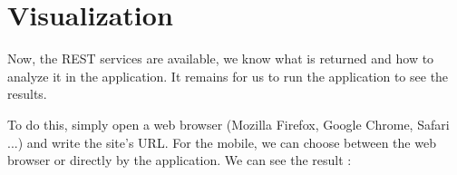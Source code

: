 

\section{Visualization}




Now, the REST services are available, we know what is returned and how to analyze it in the application. It remains for us to run the application to see the results.

To do this, simply open a web browser (Mozilla Firefox, Google Chrome, Safari ...) and write the site's URL. For the mobile, we can choose between the web browser or directly by the application. We can see the result : 

